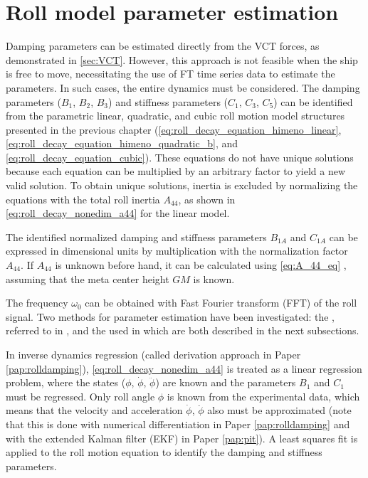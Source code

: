 \section{Roll model parameter estimation} \label{sec:_roll}
\noindent Damping parameters can be estimated directly from the VCT forces, as demonstrated in \autoref{sec:VCT}. However, this approach is not feasible when the ship is free to move, necessitating the use of FT time series data to estimate the parameters. In such cases, the entire dynamics must be considered. The damping parameters ($B_1$, $B_2$, $B_3$) and stiffness parameters ($C_1$, $C_3$, $C_5$) can be identified from the parametric linear, quadratic, and cubic roll motion model structures presented in the previous chapter (\autoref{eq:roll_decay_equation_himeno_linear}, \autoref{eq:roll_decay_equation_himeno_quadratic_b}, and \autoref{eq:roll_decay_equation_cubic}).
These equations do not have unique solutions because each equation can be multiplied by an arbitrary factor to yield a new valid solution. To obtain unique solutions, inertia is excluded by normalizing the equations with the total roll inertia $A_{44}$, as shown in \autoref{eq:roll_decay_nonedim_a44} for the linear model.



\noindent The identified normalized damping and stiffness parameters $B_{1A}$ and $C_{1A}$ can be expressed in dimensional units by multiplication with the normalization factor $A_{44}$. If $A_{44}$ is unknown before hand, it can be calculated using \autoref{eq:A_44_eq} \cite{piehlShipRollDamping2016}, assuming that the meta center height $GM$ is known.

The frequency $\omega_0$ can be obtained with Fast Fourier transform (FFT) of the roll signal. 
Two methods for parameter estimation have been investigated: the , referred to in \textcite{imo1200InterimGuidelines2006}, and the  used in \textcite{soderAssessmentShipRoll2019} which are both described in the next subsections. 

In inverse dynamics regression (called derivation approach in Paper \ref{pap:rolldamping}), \autoref{eq:roll_decay_nonedim_a44} is treated as a linear regression problem, where the states ($\phi$, $\dot{\phi}$, $\ddot{\phi}$) are known and the parameters $B_1$ and $C_1$ must be regressed. Only roll angle $\phi$ is known from the experimental data, which means that the velocity and acceleration $\dot{\phi}$, $\ddot{\phi}$ also must be approximated (note that this is done with numerical differentiation in Paper \ref{pap:rolldamping} and with the extended Kalman filter (EKF) in Paper \ref{pap:pit}).
A least squares fit is applied to the roll motion equation to identify the damping and stiffness parameters.

